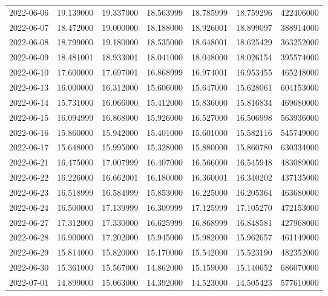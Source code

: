 \begin{tabular}{lrrrrrr}
2022-06-06 &   19.139000 &   19.337000 &   18.563999 &   18.785999 &   18.759296 &   422406000 \\
2022-06-07 &   18.472000 &   19.000000 &   18.188000 &   18.926001 &   18.899097 &   388914000 \\
2022-06-08 &   18.799000 &   19.180000 &   18.535000 &   18.648001 &   18.625429 &   363252000 \\
2022-06-09 &   18.481001 &   18.933001 &   18.041000 &   18.048000 &   18.026154 &   395574000 \\
2022-06-10 &   17.600000 &   17.697001 &   16.868999 &   16.974001 &   16.953455 &   465248000 \\
2022-06-13 &   16.000000 &   16.312000 &   15.606000 &   15.647000 &   15.628061 &   604153000 \\
2022-06-14 &   15.731000 &   16.066000 &   15.412000 &   15.836000 &   15.816834 &   469680000 \\
2022-06-15 &   16.094999 &   16.868000 &   15.926000 &   16.527000 &   16.506998 &   563936000 \\
2022-06-16 &   15.860000 &   15.942000 &   15.401000 &   15.601000 &   15.582116 &   545749000 \\
2022-06-17 &   15.648000 &   15.995000 &   15.328000 &   15.880000 &   15.860780 &   630334000 \\
2022-06-21 &   16.475000 &   17.007999 &   16.407000 &   16.566000 &   16.545948 &   483089000 \\
2022-06-22 &   16.226000 &   16.662001 &   16.180000 &   16.360001 &   16.340202 &   437135000 \\
2022-06-23 &   16.518999 &   16.584999 &   15.853000 &   16.225000 &   16.205364 &   463680000 \\
2022-06-24 &   16.500000 &   17.139999 &   16.309999 &   17.125999 &   17.105270 &   472153000 \\
2022-06-27 &   17.312000 &   17.330000 &   16.625999 &   16.868999 &   16.848581 &   427968000 \\
2022-06-28 &   16.900000 &   17.202000 &   15.945000 &   15.982000 &   15.962657 &   461149000 \\
2022-06-29 &   15.814000 &   15.820000 &   15.170000 &   15.542000 &   15.523190 &   482352000 \\
2022-06-30 &   15.361000 &   15.567000 &   14.862000 &   15.159000 &   15.140652 &   686070000 \\
2022-07-01 &   14.899000 &   15.063000 &   14.392000 &   14.523000 &   14.505423 &   577610000 \\

\end{tabular}
